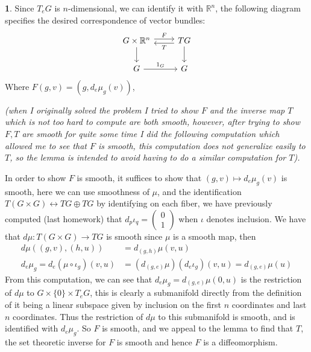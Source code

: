 \documentclass[10.5pt]{article}
\theoremstyle{definition}
\newtheorem{pb}{}
\newcommand{\set}[1]{\{#1\}}
\begin{document}
\begin{pb}
        Since \(T_eG\) is \(n\)-dimensional, we can identify it with \(\mathbb{R}^n\), the following diagram specifies the desired correspondence of vector bundles:
        \begin{equation*}
            \begin{tikzcd}
            G\times \mathbb{R}^n \arrow[d] \arrow[r,"F",shift left=1] &TG \arrow[l,"T", shift left = 1] \arrow[d] \\
            G \arrow[r, "1_G"] & G
            \end{tikzcd}
        \end{equation*}
        Where \(F(g,v) = (g,d_e\mu_g (v))\), 
        
        \emph{(when I originally solved the problem I tried to show \(F\) and the inverse map \(T\) which is not too hard to compute are both smooth, however, after trying to show \(F,T\) are smooth for quite some time I did the following computation which allowed me to see that \(F\) is smooth, this computation does not generalize easily to \(T\), so the lemma is intended to avoid having to do a similar computation for \(T\)).}

        In order to show \(F\) is smooth, it suffices to show that \((g,v) \mapsto d_e\mu_g(v)\) is smooth, here we can use smoothness of \(\mu\), and the identification \(T(G\times G) \longleftrightarrow TG \oplus TG\) by identifying on each fiber, we have previously computed (last homework) that \(d_p \iota_q = \begin{pmatrix}0 \\ 1\end{pmatrix}\) when \(\iota\) denotes inclusion. We have that \(d\mu: T(G\times G) \to TG\) is smooth since \(\mu\) is a smooth map, then
        \begin{align*}
            d\mu((g,v),(h,u)) &= d_{(g,h)}\mu(v,u) \\
            d_e \mu_g = d_e (\mu\circ\iota_g) (v,u) &= (d_{(g,e)}\mu) (d_e\iota_g)(v,u) = d_{(g,e)}\mu(u)
        \end{align*}
        From this computation, we can see that \(d_e \mu_g = d_{(g,e)}\mu(0,u)\) is the restriction of \(d\mu\) to \(G \times \set{0} \times T_eG\), this is clearly a submanifold directly from the definition of it being a linear subspace given by inclusion on the first \(n\) coordinates and last \(n\) coordinates. Thus the restriction of \(d\mu\) to this submanifold is smooth, and is identified with \(d_e \mu_g\). So \(F\) is smooth, and we appeal to the lemma to find that \(T\), the set theoretic inverse for \(F\) is smooth and hence \(F\) is a diffeomorphism.
    \end{pb}
\end{document}
